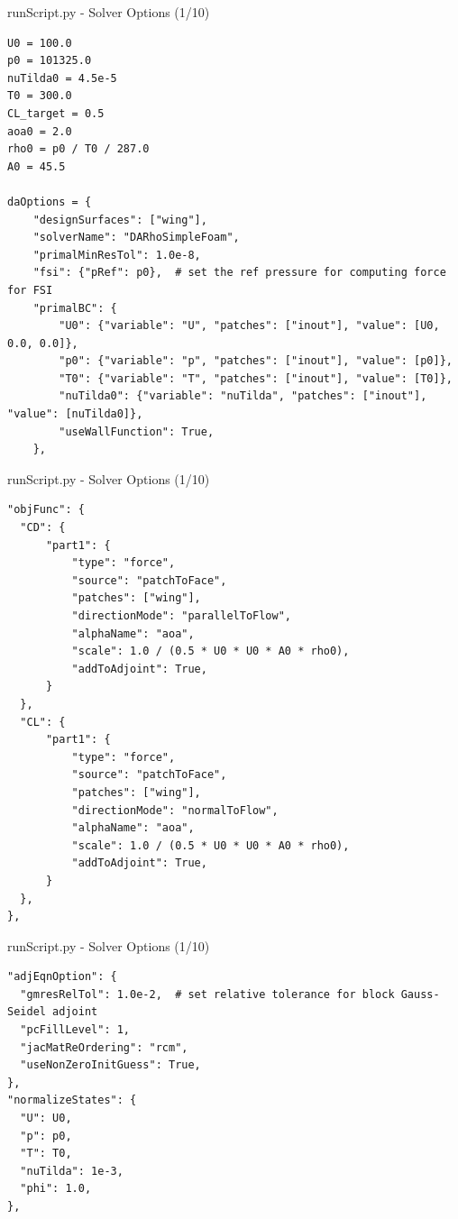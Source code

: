 \documentclass{bredelebeamer}
\begin{document}
\begin{frame}[fragile]{runScript.py - Solver Options (1/10)}
\scriptsize
\lstset{ language=bash }
\begin{lstlisting}
U0 = 100.0
p0 = 101325.0
nuTilda0 = 4.5e-5
T0 = 300.0
CL_target = 0.5
aoa0 = 2.0
rho0 = p0 / T0 / 287.0
A0 = 45.5

daOptions = {
    "designSurfaces": ["wing"],
    "solverName": "DARhoSimpleFoam",
    "primalMinResTol": 1.0e-8,
    "fsi": {"pRef": p0},  # set the ref pressure for computing force for FSI
    "primalBC": {
        "U0": {"variable": "U", "patches": ["inout"], "value": [U0, 0.0, 0.0]},
        "p0": {"variable": "p", "patches": ["inout"], "value": [p0]},
        "T0": {"variable": "T", "patches": ["inout"], "value": [T0]},
        "nuTilda0": {"variable": "nuTilda", "patches": ["inout"], "value": [nuTilda0]},
        "useWallFunction": True,
    },
\end{lstlisting}
\normalsize
\end{frame}

\begin{frame}[fragile]{runScript.py - Solver Options (1/10)}
\scriptsize
\lstset{ language=bash }
\begin{lstlisting}
"objFunc": {
  "CD": {
      "part1": {
          "type": "force",
          "source": "patchToFace",
          "patches": ["wing"],
          "directionMode": "parallelToFlow",
          "alphaName": "aoa",
          "scale": 1.0 / (0.5 * U0 * U0 * A0 * rho0),
          "addToAdjoint": True,
      }
  },
  "CL": {
      "part1": {
          "type": "force",
          "source": "patchToFace",
          "patches": ["wing"],
          "directionMode": "normalToFlow",
          "alphaName": "aoa",
          "scale": 1.0 / (0.5 * U0 * U0 * A0 * rho0),
          "addToAdjoint": True,
      }
  },
},
\end{lstlisting}
\normalsize
\end{frame}

\begin{frame}[fragile]{runScript.py - Solver Options (1/10)}
\scriptsize
\lstset{ language=bash }
\begin{lstlisting}
"adjEqnOption": {
  "gmresRelTol": 1.0e-2,  # set relative tolerance for block Gauss-Seidel adjoint
  "pcFillLevel": 1,
  "jacMatReOrdering": "rcm",
  "useNonZeroInitGuess": True,
},
"normalizeStates": {
  "U": U0,
  "p": p0,
  "T": T0,
  "nuTilda": 1e-3,
  "phi": 1.0,
},
\end{lstlisting}
\normalsize
\end{frame}
\end{document}
